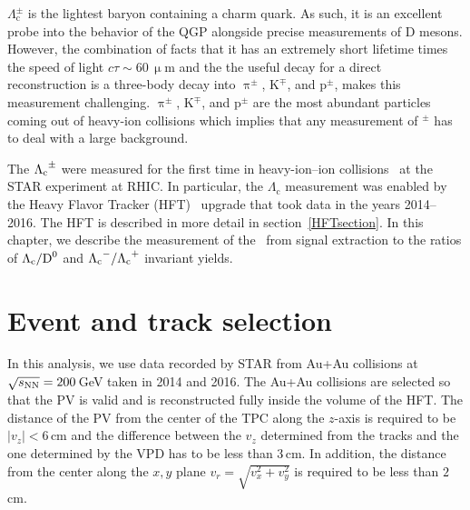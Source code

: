         $\Lambda_\mathrm{c}^\pm$ is the lightest baryon containing a charm quark. As such, it is an excellent probe into the behavior of the QGP alongside precise measurements of D mesons. However, the combination of facts that it has an extremely short lifetime times the speed of light $c\tau \sim 60\,\upmu$m and the the useful decay for a direct reconstruction is a three-body decay into $\uppi^\pm$, K$^\mp$, and p$^\pm$, makes this measurement challenging. $\uppi^\pm$, K$^\mp$, and p$^\pm$ are the most abundant particles coming out of heavy-ion collisions which implies that any measurement of \Lambdac$^\pm$ has to deal with a large background.

The ${\Lambda_\text{c}}^\pm$ were measured for the first time in heavy-ion--ion collisions~\cite{GuannanLc} at the STAR experiment at RHIC\@. In particular, the $\Lambda_\mathrm{c}$ measurement was enabled by the Heavy Flavor Tracker (HFT)~\cite{HFTLeo} upgrade that took data in the years 2014--2016\@. The HFT is described in more detail in section~\ref{HFTsection}\@. In this chapter, we describe the measurement of the \Lambdac\ from signal extraction to the ratios of ${\Lambda_\text{c}}/{\text{D}^0}$ and ${\Lambda_\text{c}}^-/{\Lambda_\text{c}}^+$ invariant yields. 



\section{\label{eventAndTrackSelection}Event and track selection}
In this analysis, we use data recorded by STAR from Au+Au collisions at $\sqrt{s_\text{NN}} = 200\,$GeV taken in 2014 and 2016. The Au+Au collisions are selected so that the PV is valid and is reconstructed fully inside the volume of the HFT\@. The distance of the PV from the center of the TPC along the $z$-axis is required to be $|v_z| < 6\,$cm and the difference between the $v_z$ determined from the tracks and the one determined by the VPD has to be less than 3$\,$cm. In addition, the distance from the center along the $x,y$ plane $v_r = \sqrt{v_x^2 + v_y^2}$ is required to be less than $2\,$cm.

